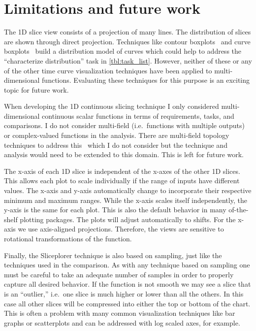 \section{Limitations and future work}

The 1D slice view consists of a projection of many lines.  The distribution of
slices are shown through direct projection. Techniques like contour
boxplots~\cite{Whitaker:2013} and curve boxplots~\cite{Mirzargar:2014} build a
distribution model of curves which could help to address the ``characterize
distribution'' task in \autoref{tbl:task_list}. However, neither of these or
any of the other time curve visualization techniques have been applied to
multi-dimensional functions. Evaluating these techniques for this purpose is an
exciting topic for future work.

When developing the 1D continuous slicing technique I only considered
multi-dimensional continuous scalar functions in terms of requirements, 
tasks, and comparisons. I do not consider multi-field 
(i.e.\ functions with multiple outputs) or complex-valued functions in the
analysis. There are multi-field topology techniques to address 
this~\cite{Duke:2012,Huettenberger:2014,Carr:2015} which I do not consider
but the technique and analysis would need to be extended to this domain.
This is left for future work.

The x-axis of each 1D slice is independent of the x-axes of the other 1D
slices. This allows each plot to scale individually if the range of inputs have
different values.  The x-axis and y-axis automatically change to incorporate
their respective minimum and maximum ranges. While the x-axis scales itself
independently, the y-axis is the same for each plot.  This is also the default
behavior in many of-the-shelf plotting packages. The plots will adjust
automatically to shifts.  For the x-axis we use axis-aligned projections.
Therefore, the views are sensitive to rotational transformations of the
function. 

Finally, the Sliceplorer technique is also based on sampling, just like the 
techniques used in the comparison.
As with any technique based on sampling one
must be careful to take an adequate number of samples in order to properly
capture all desired behavior.
If the function is not smooth we may see a slice that is an ``outlier,'' i.e.\
one slice is much higher or lower than all the others. In this case all other
slices will be compressed into either the top or bottom of the chart. This is
often a problem with many common visualization techniques like bar graphs or
scatterplots and can be addressed with log scaled axes, for example.

